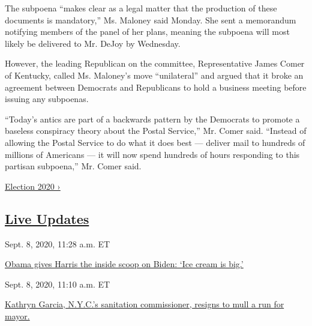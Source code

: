 The subpoena ``makes clear as a legal matter that the production of
these documents is mandatory,'' Ms. Maloney said Monday. She sent a
memorandum notifying members of the panel of her plans, meaning the
subpoena will most likely be delivered to Mr. DeJoy by Wednesday.

However, the leading Republican on the committee, Representative James
Comer of Kentucky, called Ms. Maloney's move ``unilateral'' and argued
that it broke an agreement between Democrats and Republicans to hold a
business meeting before issuing any subpoenas.

``Today's antics are part of a backwards pattern by the Democrats to
promote a baseless conspiracy theory about the Postal Service,'' Mr.
Comer said. ``Instead of allowing the Postal Service to do what it does
best --- deliver mail to hundreds of millions of Americans --- it will
now spend hundreds of hours responding to this partisan subpoena,'' Mr.
Comer said.

\href{https://www.nytimes3xbfgragh.onion/news-event/2020-election}{Election
2020 ›}

\hypertarget{live-updates}{%
\subsection{\texorpdfstring{\href{https://www.nytimes3xbfgragh.onion/live/2020/09/08/us/trump-vs-biden}{Live
Updates}}{Live Updates}}\label{live-updates}}

\href{https://www.nytimes3xbfgragh.onion/live/2020/09/08/us/trump-vs-biden\#obama-gives-harris-the-inside-scoop-on-biden-ice-cream-is-big}{}

Sept. 8, 2020, 11:28 a.m. ET

\href{https://www.nytimes3xbfgragh.onion/live/2020/09/08/us/trump-vs-biden\#obama-gives-harris-the-inside-scoop-on-biden-ice-cream-is-big}{Obama
gives Harris the inside scoop on Biden: `Ice cream is
big.'}\href{https://www.nytimes3xbfgragh.onion/live/2020/09/08/us/trump-vs-biden\#kathryn-garcia-nycs-sanitation-commissioner-resigns-to-mull-a-run-for-mayor}{}

Sept. 8, 2020, 11:10 a.m. ET

\href{https://www.nytimes3xbfgragh.onion/live/2020/09/08/us/trump-vs-biden\#kathryn-garcia-nycs-sanitation-commissioner-resigns-to-mull-a-run-for-mayor}{Kathryn
Garcia, N.Y.C.'s sanitation commissioner, resigns to mull a run for
mayor.}\href{https://www.nytimes3xbfgragh.onion/live/2020/09/08/us/trump-vs-biden\#a-top-house-democrat-calls-for-the-suspension-of-postmaster-general-louis-dejoy-over-campaign-finance-allegations}{}

